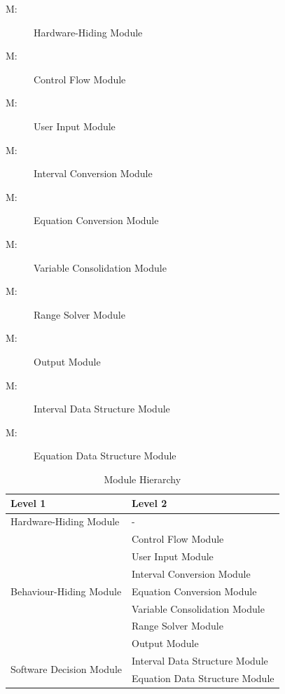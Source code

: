 \documentclass[12pt, titlepage]{article}
\newcounter{mnum}
\newcommand{\mthemnum}{M\themnum}
\begin{document}
\begin{description}
\item [ \mthemnum \label{mHH}:] Hardware-Hiding Module

\item [ \mthemnum \label{mCF}:] Control Flow Module

\item [ \mthemnum \label{mUI}:] User Input Module

\item [ \mthemnum \label{mIC}:] Interval Conversion Module

\item [ \mthemnum \label{mEC}:] Equation Conversion Module

\item [ \mthemnum \label{mVC}:] Variable Consolidation 
Module

\item [ \mthemnum \label{mRS}:] Range Solver Module

\item [ \mthemnum \label{mO}:] Output Module

\item [ \mthemnum \label{mIDS}:] Interval Data Structure 
Module

\item [ \mthemnum \label{mEDS}:] Equation Data Structure 
Module

\end{description}


\begin{table}[h!]
\centering
\begin{tabular}{p{} p{}}
\toprule
\textbf{Level 1} & \textbf{Level 2}\\
\midrule

{Hardware-Hiding Module} & - \\
\midrule

\multirow{7}{0.29\textwidth}{Behaviour-Hiding Module} & Control Flow Module \\
& User Input Module \\
& Interval Conversion Module \\
& Equation Conversion Module \\
& Variable Consolidation Module \\
& Range Solver Module \\
& Output Module \\
\midrule

\multirow{2}{0.29\textwidth}{Software Decision Module} & Interval Data 
Structure Module \\
& Equation Data Structure Module \\
\bottomrule

\end{tabular}
\caption{Module Hierarchy}
\label{TblMH}
\end{table}
\end{document}
